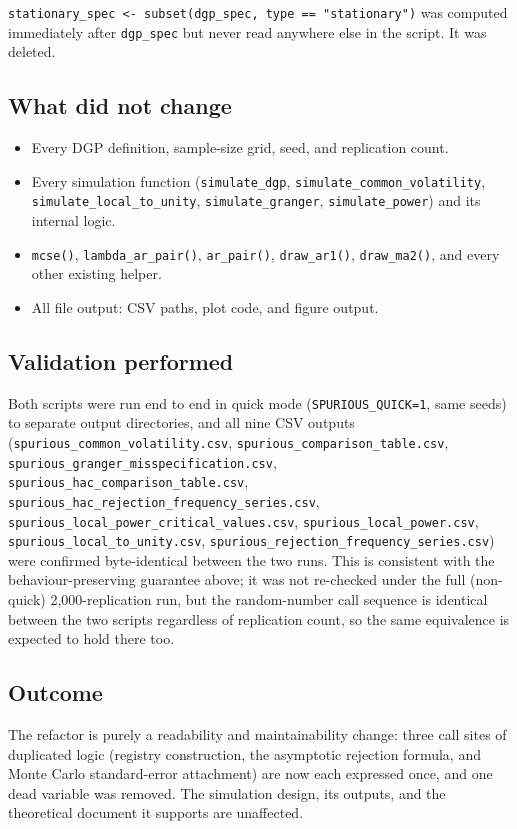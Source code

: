 \documentclass[
  letterpaper,
  DIV=11,
  numbers=noendperiod]{scrartcl}
\providecommand{\tightlist}{%
  \setlength{\itemsep}{0pt}\setlength{\parskip}{0pt}}
\begin{document}
\texttt{stationary\_spec\ \textless{}-\ subset(dgp\_spec,\ type\ ==\ "stationary")}
was computed immediately after \texttt{dgp\_spec} but never read
anywhere else in the script. It was deleted.

\subsection{What did not change}\label{what-did-not-change}

\begin{itemize}
\tightlist
\item
  Every DGP definition, sample-size grid, seed, and replication count.
\item
  Every simulation function (\texttt{simulate\_dgp},
  \texttt{simulate\_common\_volatility},
  \texttt{simulate\_local\_to\_unity}, \texttt{simulate\_granger},
  \texttt{simulate\_power}) and its internal logic.
\item
  \texttt{mcse()}, \texttt{lambda\_ar\_pair()}, \texttt{ar\_pair()},
  \texttt{draw\_ar1()}, \texttt{draw\_ma2()}, and every other existing
  helper.
\item
  All file output: CSV paths, plot code, and figure output.
\end{itemize}

\subsection{Validation performed}\label{validation-performed}

Both scripts were run end to end in quick mode
(\texttt{SPURIOUS\_QUICK=1}, same seeds) to separate output directories,
and all nine CSV outputs (\texttt{spurious\_common\_volatility.csv},
\texttt{spurious\_comparison\_table.csv},
\texttt{spurious\_granger\_misspecification.csv},
\texttt{spurious\_hac\_comparison\_table.csv},
\texttt{spurious\_hac\_rejection\_frequency\_series.csv},
\texttt{spurious\_local\_power\_critical\_values.csv},
\texttt{spurious\_local\_power.csv},
\texttt{spurious\_local\_to\_unity.csv},
\texttt{spurious\_rejection\_frequency\_series.csv}) were confirmed
byte-identical between the two runs. This is consistent with the
behaviour-preserving guarantee above; it was not re-checked under the
full (non-quick) 2,000-replication run, but the random-number call
sequence is identical between the two scripts regardless of replication
count, so the same equivalence is expected to hold there too.

\subsection{Outcome}\label{outcome}

The refactor is purely a readability and maintainability change: three
call sites of duplicated logic (registry construction, the asymptotic
rejection formula, and Monte Carlo standard-error attachment) are now
each expressed once, and one dead variable was removed. The simulation
design, its outputs, and the theoretical document it supports are
unaffected.
\end{document}
